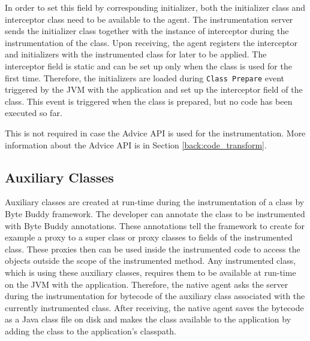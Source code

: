 In order to set this field by corresponding initializer, both the initializer class and interceptor class need to be available to the agent. The instrumentation server sends the initializer class together with the instance of interceptor during the instrumentation of the class. Upon receiving, the agent registers the interceptor and initializers with the instrumented class for later to be applied. The interceptor field is static and can be set up only when the class is used for the first time. Therefore, the initializers are loaded during \texttt{Class Prepare} event triggered by the JVM with the application and set up the interceptor field of the class. This event is triggered when the class is prepared, but no code has been executed so far. 

This is not required in case the Advice API is used for the instrumentation. More information about the Advice API is in Section \ref{back:code_transform}.

\subsection{Auxiliary Classes}
Auxiliary classes are created at run-time during the instrumentation of a class by Byte Buddy framework. The developer can annotate the class to be instrumented with Byte Buddy annotations. These annotations tell the framework to create for example a proxy to a super class or proxy classes to fields of the instrumented class. These proxies then can be used inside the instrumented code to access the objects outside the scope of the instrumented method. Any instrumented class, which is using these auxiliary classes, requires them to be available at run-time on the JVM with the application. Therefore, the native agent asks the server during the instrumentation for bytecode of the auxiliary class associated with the currently instrumented class. After receiving, the native agent saves the bytecode as a Java class file on disk and makes the class available to the application by adding the class to the application's classpath.

